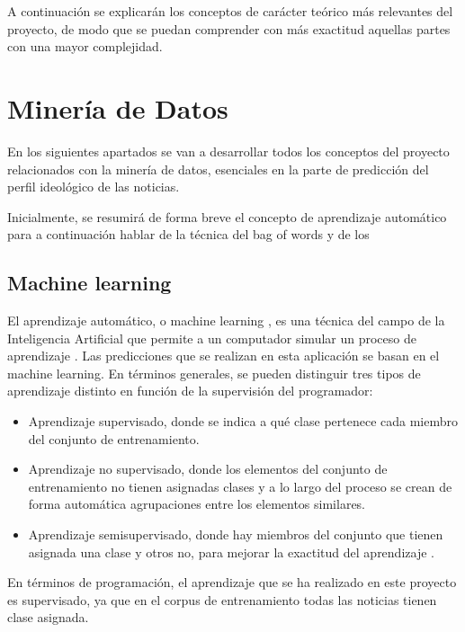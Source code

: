 A continuación se explicarán los conceptos de carácter teórico más relevantes del proyecto, de modo que se puedan comprender con más exactitud aquellas partes con una mayor complejidad.


\section{Minería de Datos}

En los siguientes apartados se van a desarrollar todos los conceptos del proyecto relacionados con la minería de datos, esenciales en la parte de predicción del perfil ideológico de las noticias.

Inicialmente, se resumirá de forma breve el concepto de aprendizaje automático para a continuación hablar de la técnica del bag of words y de los 

\subsection{Machine learning}

El aprendizaje automático, o machine learning \cite{andrieu2003introduction}, es una técnica del campo de la Inteligencia Artificial que permite a un computador simular un proceso de aprendizaje \cite{wiki:machinelearning}. Las predicciones que se realizan en esta aplicación se basan en el machine learning. En términos generales, se pueden distinguir tres tipos de aprendizaje distinto en función de la supervisión del programador:

\begin{itemize}

\item Aprendizaje supervisado, donde se indica a qué clase pertenece cada miembro del conjunto de entrenamiento.

\item Aprendizaje no supervisado, donde los elementos del conjunto de entrenamiento no tienen asignadas clases y a lo largo del proceso se crean de forma automática 
agrupaciones entre los elementos similares.

\item Aprendizaje semisupervisado, donde hay miembros del conjunto que tienen asignada una clase y otros no, para mejorar la exactitud del aprendizaje \cite{wiki:semisupervised}.

\end{itemize}

En términos de programación, el aprendizaje que se ha realizado en este proyecto es supervisado, ya que en el corpus de entrenamiento todas las noticias tienen clase asignada.

